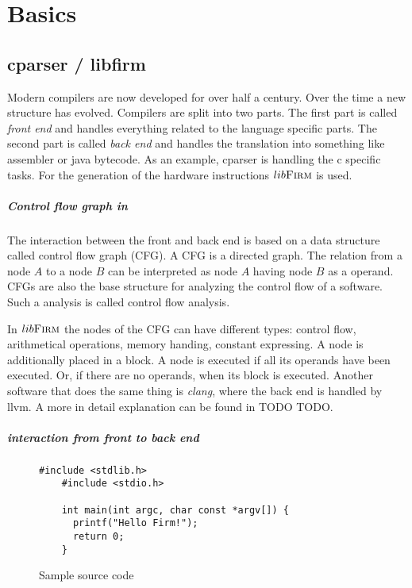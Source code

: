 \chapter{Basics}\label{sec:basics}

\section{cparser / libfirm}
Modern compilers are now developed for over half a century. Over the time a new structure has evolved. Compilers are split into two parts. The first part is called \textit{front end} and handles everything related to the language specific parts. The second part is called \textit{back end} and handles the translation into something like assembler or java bytecode. As an example, cparser is handling the c specific tasks. For the generation of the hardware instructions $lib\textsc{Firm}$ is used.

\paragraph{Control flow graph in \libFIRM} The interaction between the front and back end is based on a data structure called control flow graph (CFG). A CFG is a directed graph. The relation from a node $A$ to a node $B$ can be interpreted as node $A$ having node $B$ as a operand.
CFGs are also the base structure for analyzing the control flow of a software. Such a analysis is called control flow analysis.

In $lib\textsc{Firm}$ the nodes of the CFG can have different types: control flow, arithmetical operations, memory handing, constant expressing. A node is additionally placed in a block. A node is executed if all its operands have been executed. Or, if there are no operands, when its block is executed.
Another software that does the same thing is \textit{clang}, where the back end is handled by llvm.
A more in detail explanation can be found in TODO TODO.

\paragraph{interaction from front to back end}

\begin{figure}
	\centering
	\begin{lstlisting}[frame=single]
	#include <stdlib.h>
	#include <stdio.h>
	
	int main(int argc, char const *argv[]) {
	  printf("Hello Firm!");
	  return 0;
	}
	\end{lstlisting} 
	\caption{Sample source code}
	\label{code:workflow:example}
\end{figure}

